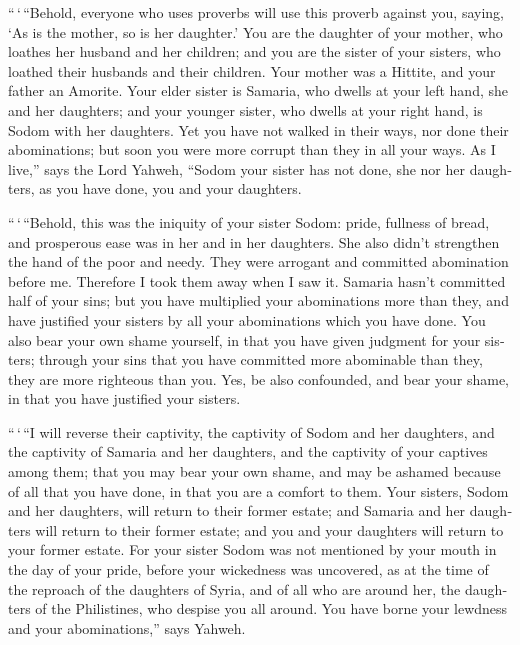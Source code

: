 \begin{paracol}{2}
\begin{otherlanguage}{english}
 ``\,`\,``Behold, everyone who uses proverbs will use
this proverb against you, saying, `As is the mother, so is her
daughter.'  You are the daughter of your mother, who
loathes her husband and her children; and you are the sister of your
sisters, who loathed their husbands and their children. Your mother was
a Hittite, and your father an Amorite.  Your elder sister
is Samaria, who dwells at your left hand, she and her daughters; and
your younger sister, who dwells at your right hand, is Sodom with her
daughters.  Yet you have not walked in their ways, nor
done their abominations; but soon you were more corrupt than they in all
your ways.  As I live,'' says the Lord Yahweh, ``Sodom
your sister has not done, she nor her daughters, as you have done, you
and your daughters.

 ``\,`\,``Behold, this was the iniquity of your sister
Sodom: pride, fullness of bread, and prosperous ease was in her and in
her daughters. She also didn't strengthen the hand of the poor and
needy.  They were arrogant and committed abomination
before me. Therefore I took them away when I saw it. 
Samaria hasn't committed half of your sins; but you have multiplied your
abominations more than they, and have justified your sisters by all your
abominations which you have done.  You also bear your own
shame yourself, in that you have given judgment for your sisters;
through your sins that you have committed more abominable than they,
they are more righteous than you. Yes, be also confounded, and bear your
shame, in that you have justified your sisters.

 ``\,`\,``I will reverse their captivity, the captivity
of Sodom and her daughters, and the captivity of Samaria and her
daughters, and the captivity of your captives among them;
 that you may bear your own shame, and may be ashamed
because of all that you have done, in that you are a comfort to them.
 Your sisters, Sodom and her daughters, will return to
their former estate; and Samaria and her daughters will return to their
former estate; and you and your daughters will return to your former
estate.  For your sister Sodom was not mentioned by your
mouth in the day of your pride,  before your wickedness
was uncovered, as at the time of the reproach of the daughters of Syria,
and of all who are around her, the daughters of the Philistines, who
despise you all around.  You have borne your lewdness and
your abominations,'' says Yahweh.


\end{otherlanguage}
\end{paracol}
